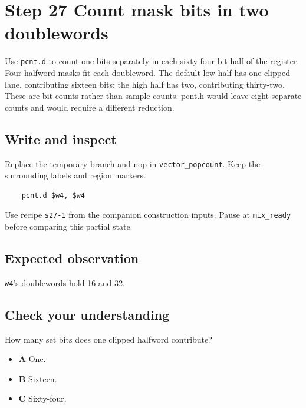 \section{Step 27 Count mask bits in two doublewords}\label{pcm-s27}

Use \texttt{pcnt.d} to count one bits separately in each sixty-four-bit half of the register. Four halfword masks fit each doubleword. The default low half has one clipped lane, contributing sixteen bits; the high half has two, contributing thirty-two. These are bit counts rather than sample counts. pcnt.h would leave eight separate counts and would require a different reduction.

\subsection{Write and inspect}
Replace the temporary branch and nop in \texttt{vector\_popcount}. Keep the surrounding labels and region markers.

\begin{verbatim}
    pcnt.d $w4, $w4
\end{verbatim}
Use recipe \texttt{s27-1} from the companion construction inputs. Pause at \texttt{mix\_ready} before comparing this partial state.

\subsection{Expected observation}
\texttt{w4}’s doublewords hold 16 and 32.

\subsection{Check your understanding}
How many set bits does one clipped halfword contribute?

\begin{itemize}
\item \textbf{A} One.
\item \textbf{B} Sixteen.
\item \textbf{C} Sixty-four.
\end{itemize}
